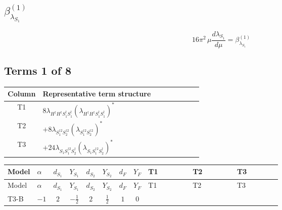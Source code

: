 \documentclass[8pt]{article}
\begin{document}
\begin{landscape}
\section*{$\beta_{\lambda_{S_1}}^{(1)}$}
\[16\pi^2\,\mu\frac{d \lambda_{S_1}}{d\mu}=\beta_{\lambda_{S_1}}^{(1)}\]
\subsection*{Terms 1 of 8}
\begin{center}
\begin{tabular}{@{}c >{\raggedright\arraybackslash}p{0.82\linewidth}@{}}
\toprule
Column & Representative term structure \\
\midrule
T1 & \(\displaystyle 8 {\lambda_{H^\dagger H^\dagger S_1^\dagger S_1^\dagger}} \left({\lambda_{H^\dagger H^\dagger S_1^\dagger S_1^\dagger}}\right)^{*}\) \\
\midrule
T2 & \(\displaystyle +8 {\lambda_{S_1^{\dagger 2}S_2^{\dagger 2}}} \left({\lambda_{S_1^{\dagger 2}S_2^{\dagger 2}}}\right)^{*}\) \\
\midrule
T3 & \(\displaystyle +24 {\lambda_{S_1 S_1^{\dagger 2}S_2^\dagger}} \left({\lambda_{S_1 S_1^{\dagger 2}S_2^\dagger}}\right)^{*}\) \\
\midrule
\bottomrule
\end{tabular}
\end{center}
\smallskip
\tiny
\begin{longtable}{@{}llcccccc >{\raggedright\arraybackslash}p{0.21\linewidth} >{\raggedright\arraybackslash}p{0.21\linewidth} >{\raggedright\arraybackslash}p{0.21\linewidth}@{}}
\toprule
Model & $\alpha$ & $d_{S_1}$ & $Y_{S_1}$ & $d_{S_2}$ & $Y_{S_2}$ & $d_F$ & $Y_F$ & T1 & T2 & T3 \\
\midrule
\endfirsthead
\toprule
Model & $\alpha$ & $d_{S_1}$ & $Y_{S_1}$ & $d_{S_2}$ & $Y_{S_2}$ & $d_F$ & $Y_F$ & T1 & T2 & T3 \\
\midrule
\endhead
T3-B & $-1$ & $2$ & $-\frac{1}{2}$ & $2$ & $\frac{1}{2}$ & $1$ & $0$ & \scriptsize\adjustbox{max width=\linewidth}{$\begin{gathered} 8 {\lambda_{H^\dagger H^\dagger S_1^\dagger S_1^\dagger}} \left({\lambda_{H^\dagger H^\dagger S_1^\dagger S_1^\dagger}}\right)^{*}\end{gathered}$} & \scriptsize\adjustbox{max width=\linewidth}{$\begin{gathered} +8 {\lambda_{S_1^{\dagger 2}S_2^{\dagger 2}}} \left({\lambda_{S_1^{\dagger 2}S_2^{\dagger 2}}}\right)^{*}\end{gathered}$} & \scriptsize\adjustbox{max width=\linewidth}{$\begin{gathered} +24 {\lambda_{S_1 S_1^{\dagger 2}S_2^\dagger}} \left({\lambda_{S_1 S_1^{\dagger 2}S_2^\dagger}}\right)^{*}\end{gathered}$} \\

\end{longtable}
\end{landscape}
\end{document}
